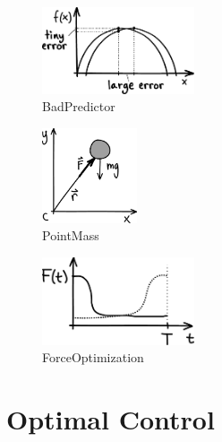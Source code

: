 \begin{figure}[h]		%
\begin{centering}
\includegraphics[width=0.4\textwidth]{Figures/BadPredictor}\par
\end{centering}
\caption{BadPredictor}
\label{fig:BadPredictor}
\end{figure}
%

\begin{figure}[h]		%
\begin{centering}
\includegraphics[width=0.25\textwidth]{Figures/PointMass}\par
\end{centering}
\caption{PointMass}
\label{fig:PointMass}
\end{figure}
%


\begin{figure}[h]		%
\begin{centering}
\includegraphics[width=0.4\textwidth]{Figures/ForceOptimization}\par
\end{centering}
\caption{ForceOptimization}
\label{fig:ForceOptimization}
\end{figure}
%

\section{Optimal Control} %
\label{sec:OptimalControl}

